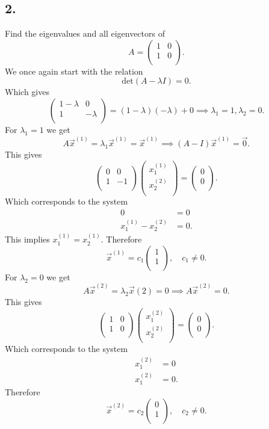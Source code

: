 \subsection*{2.} Find the eigenvalues and all eigenvectors of
\[ 
A = \begin{pmatrix}
1 & 0\\
1 & 0\\
\end{pmatrix}
.\]
\bigbreak
We once again start with the relation
\[ 
\mathrm{det}(A - \lambda I) = 0
.\]
Which gives
\[ 
\begin{pmatrix}
1 - \lambda & 0\\
1 & -\lambda\\
\end{pmatrix} = (1 - \lambda)(-\lambda) + 0 \implies \lambda_1 = 1, \lambda_2 = 0
.\]
For $\lambda_1 = 1$ we get
\[ 
A \Vec{x}^{(1)} = \lambda_1 \Vec{x}^{(1)} = \Vec{x}^{(1)} \implies (A - I) \Vec{x}^{(1)} = \Vec{0}
.\]
This gives
\[ 
\begin{pmatrix}
0 & 0\\
1 & -1\\
\end{pmatrix} \begin{pmatrix}
x_1^{(1)}\\
x_2^{(2)}\\
\end{pmatrix} = \begin{pmatrix}
0\\
0\\
\end{pmatrix}
.\]
Which corresponds to the system
\begin{align*}
  0 &= 0 \\
  x_1^{(1)} - x_2^{(2)} &= 0
.\end{align*}
This implies $x_1^{(1)} = x_2^{(1)}$. Therefore
\[ 
\Vec{x}^{(1)} = c_1 \begin{pmatrix}
1\\
1\\
\end{pmatrix}, \quad c_1 \neq 0
.\]
For $\lambda_2 = 0$ we get
\[ 
A \Vec{x}^{(2)} = \lambda_2 \Vec{x}(2) = 0 \implies A \Vec{x}^{(2)} = 0
.\]
This gives
\[ 
\begin{pmatrix}
1 & 0\\
1 & 0\\
\end{pmatrix} \begin{pmatrix}
x_1^{(2)}\\
x_2^{(2)}\\
\end{pmatrix} = \begin{pmatrix}
0\\
0\\
\end{pmatrix}
.\]
Which corresponds to the system
\begin{align*}
  x_1^{(2)} &= 0 \\
  x_1^{(2)} &= 0
.\end{align*}
Therefore
\[ 
\Vec{x}^{(2)} = c_2 \begin{pmatrix}
0\\
1\\
\end{pmatrix}, \quad c_2 \neq 0
.\]


